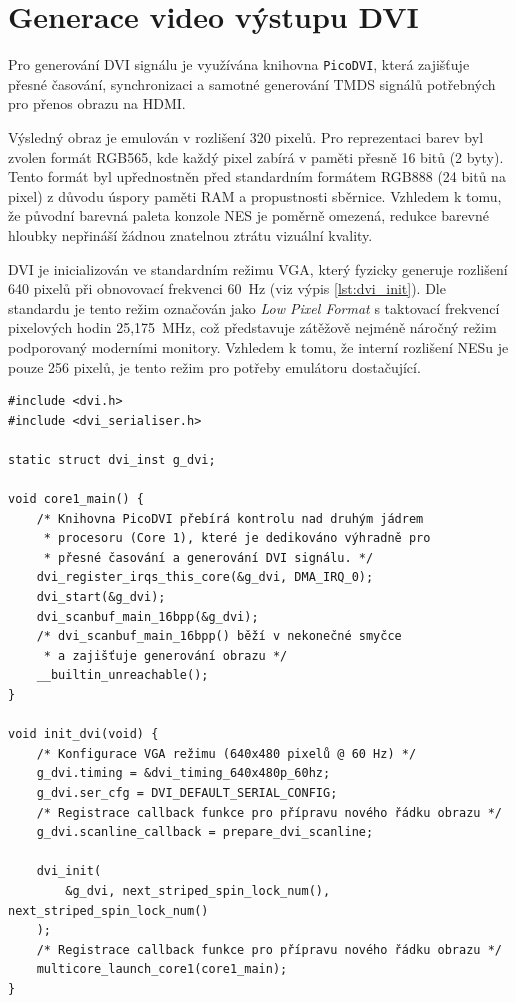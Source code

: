 \section{Generace video výstupu DVI}

Pro generování DVI signálu je využívána knihovna \texttt{PicoDVI}, která zajišťuje přesné časování,
synchronizaci a samotné generování TMDS signálů potřebných pro přenos obrazu na HDMI.

Výsledný obraz je emulován v rozlišení 320 pixelů. Pro reprezentaci barev byl zvolen
formát RGB565, kde každý pixel zabírá v paměti přesně 16 bitů (2 byty). Tento formát byl
upřednostněn před standardním formátem RGB888 (24 bitů na pixel) z důvodu úspory paměti RAM a
propustnosti sběrnice. Vzhledem k tomu, že původní barevná paleta konzole NES je poměrně omezená,
redukce barevné hloubky nepřináší žádnou znatelnou ztrátu vizuální kvality.

DVI je inicializován ve standardním režimu VGA, který fyzicky generuje rozlišení 640
pixelů při obnovovací frekvenci 60~Hz (viz výpis \ref{lst:dvi_init}). Dle standardu je tento režim
označován jako \textit{Low Pixel Format} s taktovací frekvencí pixelových hodin 25,175~MHz, což
představuje zátěžově nejméně náročný režim podporovaný moderními monitory\cite{dvi-spec}. Vzhledem
k tomu, že interní rozlišení NESu je pouze 256 pixelů, je tento režim pro potřeby
emulátoru dostačující.

\begin{listing}[htbp]
\begin{verbatim}
#include <dvi.h>
#include <dvi_serialiser.h>

static struct dvi_inst g_dvi;

void core1_main() {
    /* Knihovna PicoDVI přebírá kontrolu nad druhým jádrem
     * procesoru (Core 1), které je dedikováno výhradně pro
     * přesné časování a generování DVI signálu. */
    dvi_register_irqs_this_core(&g_dvi, DMA_IRQ_0);
    dvi_start(&g_dvi);
    dvi_scanbuf_main_16bpp(&g_dvi);
    /* dvi_scanbuf_main_16bpp() běží v nekonečné smyčce
     * a zajišťuje generování obrazu */
    __builtin_unreachable();
}

void init_dvi(void) {
    /* Konfigurace VGA režimu (640x480 pixelů @ 60 Hz) */
    g_dvi.timing = &dvi_timing_640x480p_60hz;
    g_dvi.ser_cfg = DVI_DEFAULT_SERIAL_CONFIG;
    /* Registrace callback funkce pro přípravu nového řádku obrazu */
    g_dvi.scanline_callback = prepare_dvi_scanline;

    dvi_init(
        &g_dvi, next_striped_spin_lock_num(), next_striped_spin_lock_num()
    );
    /* Registrace callback funkce pro přípravu nového řádku obrazu */
    multicore_launch_core1(core1_main);
}
\end{verbatim}
\caption{Inicializace DVI.}
\label{lst:dvi_init}
\end{listing}

